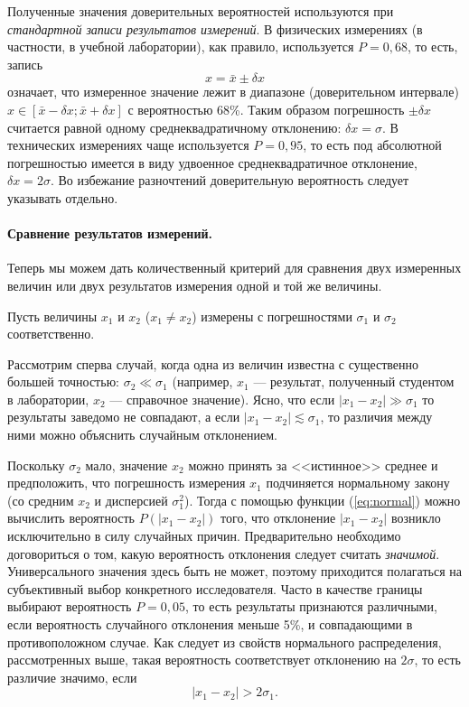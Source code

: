 Полученные значения доверительных вероятностей используются при \emph{стандартной
записи результатов измерений}. В физических измерениях (в частности,
в учебной лаборатории), как правило, используется $P=0{,}68$, то
есть, запись 
\[
x=\bar{x}\pm\delta x
\]
означает, что измеренное значение лежит в диапазоне (доверительном
интервале) $x\in\left[\bar{x}-\delta x;\bar{x}+\delta x\right]$ с
вероятностью 68\%. Таким образом погрешность $\pm\delta x$ считается
равной одному среднеквадратичному отклонению: $\delta x=\sigma$.
В технических измерениях чаще используется $P=0{,}95$, то есть под
абсолютной погрешностью имеется в виду удвоенное среднеквадратичное
отклонение, $\delta x=2\sigma$. Во избежание разночтений доверительную
вероятность следует указывать отдельно.

\paragraph{Сравнение результатов измерений.}

Теперь мы можем дать количественный критерий для сравнения двух измеренных
величин или двух результатов измерения одной и той же величины.

Пусть величины $x_{1}$ и $x_{2}$ ($x_{1}\ne x_{2}$) измерены с
погрешностями $\sigma_{1}$ и $\sigma_{2}$ соответственно. 

Рассмотрим сперва случай, когда одна из величин известна с существенно
большей точностью: $\sigma_{2}\ll\sigma_{1}$ (например, $x_{1}$
--- результат, полученный студентом в лаборатории, $x_{2}$
--- справочное значение). Ясно, что если $\left|x_{1}-x_{2}\right|\gg\sigma_{1}$
то результаты заведомо не совпадают, а если $\left|x_{1}-x_{2}\right|\lesssim\sigma_{1}$,
то различия между ними можно объяснить случайным отклонением.

Поскольку $\sigma_{2}$ мало, значение $x_{2}$ можно принять за <<истинное>>
среднее и предположить, что погрешность измерения $x_{1}$ подчиняется
нормальному закону (со средним $x_{2}$ и дисперсией $\sigma_{1}^{2}$).
Тогда с помощью функции (\ref{eq:normal}) можно вычислить вероятность
$P\left(\left|x_{1}-x_{2}\right|\right)$ того, что отклонение $\left|x_{1}-x_{2}\right|$
возникло исключительно в силу случайных причин. Предварительно необходимо
договориться о том, какую вероятность отклонения следует считать \emph{значимой}.
Универсального значения здесь быть не может, поэтому приходится полагаться
на субъективный выбор конкретного исследователя. Часто в качестве
границы выбирают вероятность $P=0{,}05$, то есть результаты признаются
различными, если вероятность случайного отклонения меньше 5\%, и совпадающими
в противоположном случае. Как следует из свойств нормального распределения,
рассмотренных выше, такая вероятность соответствует отклонению на
$2\sigma$, то есть различие значимо, если 
\[
\left|x_{1}-x_{2}\right|>2\sigma_{1}.
\]

